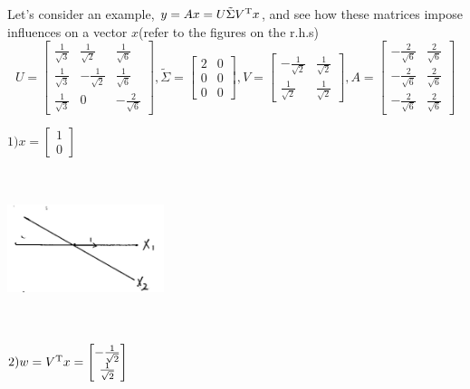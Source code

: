 \vspace{0.5cm}
\begin{example}
	Let's consider an example, $y = Ax = U\tilde{\Sigma} V^{{\rm T}}x$, and see how these matrices impose influences on a vector $x$(refer to the figures on the r.h.s)
	$$U = 
	\left[
	\begin{matrix}
	\frac{1}{\sqrt{3}}&\frac{1}{\sqrt{2}} & \frac{1}{\sqrt{6}}\\
	\frac{1}{\sqrt{3}}&-\frac{1}{\sqrt{2}} & \frac{1}{\sqrt{6}}\\
	\frac{1}{\sqrt{3}}&0 & -\frac{2}{\sqrt{6}}
	\end{matrix}
	\right]
	 ,
	\tilde{\Sigma} = 
	\left[
	\begin{matrix}
	2&0\\
	0&0\\
	0&0
	\end{matrix}
	\right] 
	,
	V = 
	\left[
	\begin{matrix}
	-\frac{1}{\sqrt{2}}&\frac{1}{\sqrt{2}}\\
	\frac{1}{\sqrt{2}}&\frac{1}{\sqrt{2}}
	\end{matrix}
	\right] 
	,
	A = 
	\left[
	\begin{matrix}
	-\frac{2}{\sqrt{6}}&\frac{2}{\sqrt{6}}\\
	-\frac{2}{\sqrt{6}}&\frac{2}{\sqrt{6}}\\
	-\frac{2}{\sqrt{6}}&\frac{2}{\sqrt{6}}
	\end{matrix}
	\right]
	$$
	
$ 1) x = 
	\left[
	\begin{matrix}
	1\\
	0
	\end{matrix}
	\right]
$
	\begin{marginfigure}
		\centering
		\includegraphics[width=1.8in,height=1.8in]{figures/ch05/figure1_a.jpg}
	\end{marginfigure}


$ 2) w = V^{{\rm T}}x = 
	\left[
	\begin{matrix}
	-\frac{1}{\sqrt{2}}\\
	\frac{1}{\sqrt{2}}
	\end{matrix}
	\right]
$
	


\end{example}
